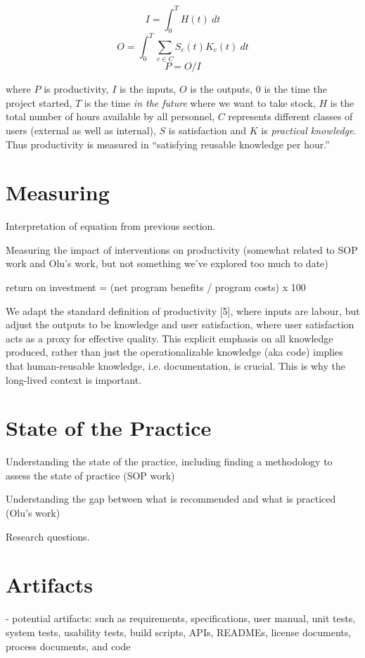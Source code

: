 \documentclass[sigconf, authorversion, nonacm]{acmart}
\begin{document}
$$ I = \int_{0}^{T} H(t)\ dt $$
$$ O = \int_{0}^{T} \sum_{c \in C} S_c(t) K_c(t)\ dt $$
$$P = O / I$$ 

\noindent where $P$ is productivity, $I$ is the inputs, $O$ is the outputs, $0$
is the time the project started, $T$ is the time \emph{in the future} where we
want to take stock, $H$ is the total number of hours available by all personnel,
$C$ represents different classes of users (external as well as internal), $S$ is
satisfaction and $K$ is \emph{practical knowledge}.  Thus productivity is
measured in ``satisfying reusable knowledge per hour.''

\section{Measuring}

Interpretation of equation from previous section.

Measuring the impact of interventions on productivity (somewhat related to SOP
work and Olu’s work, but not something we’ve explored too much to date)

return on investment = (net program benefits / program costs) x 100

We adapt the standard definition of productivity [5], where inputs are labour,
but adjust the outputs to be knowledge and user satisfaction, where user
satisfaction acts as a proxy for effective quality. This explicit emphasis on
all knowledge produced, rather than just the operationalizable knowledge (aka
code) implies that human-reusable knowledge, i.e. documentation, is crucial.
This is why the long-lived context is important.

\section{State of the Practice}

Understanding the state of the practice, including finding a methodology
to assess the state of practice (SOP work) 

Understanding the gap between what is recommended and what is practiced (Olu’s
work) 

Research questions.

\section{Artifacts}

- potential artifacts: such as requirements, specifications, user manual, unit
tests, system tests, usability tests, build scripts, APIs, READMEs, license
documents, process documents, and code
\end{document}
